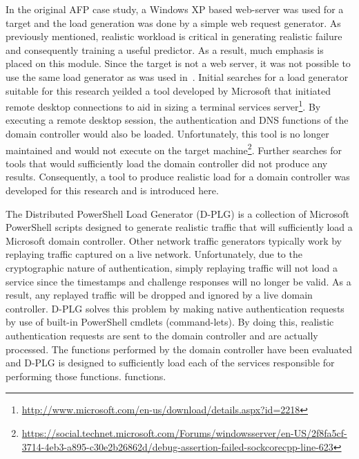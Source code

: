 In the original AFP case study, a Windows XP based web-server was used for a
target and the load generation was done by a simple web request
generator.  As previously mentioned, realistic workload is critical in
generating realistic failure and consequently training a useful predictor.  As
a result, much emphasis is placed on this module.  Since the target is not a
web server, it was not possible to use the same load generator as was used
in~\cite{irrera2015}.  Initial searches for a load generator suitable for this
research yeilded a tool developed by Microsoft that initiated remote desktop
connections to aid in sizing a terminal services
server\footnote{\url{http://www.microsoft.com/en-us/download/details.aspx?id=2218}}.
By executing a remote desktop session, the authentication and DNS functions of
the domain controller would also be loaded.  Unfortunately, this tool is no
longer maintained and would not execute on the target
machine\footnote{\url{https://social.technet.microsoft.com/Forums/windowsserver/en-US/2f8fa5cf-3714-4eb3-a895-c30e2b26862d/debug-assertion-failed-sockcorecpp-line-623}}.
Further searches for tools that would sufficiently load the domain controller
did not produce any results.  Consequently, a tool to produce realistic load
for a domain controller was developed for this research and is introduced here.


The Distributed PowerShell Load Generator (D-PLG) is a collection of Microsoft
PowerShell scripts designed to generate realistic traffic that will
sufficiently load a Microsoft domain controller.  Other network traffic
generators typically work by replaying traffic captured on a live network.
Unfortunately, due to the cryptographic nature of authentication, simply
replaying traffic will not load a service since the timestamps and challenge
responses will no longer be valid.  As a result, any replayed traffic will be
dropped and ignored by a live domain controller.  D-PLG solves this problem by
making native authentication requests by use of built-in PowerShell cmdlets
(command-lets).  By doing this, realistic authentication requests are sent to
the domain controller and are actually processed.  The functions performed by
the domain controller have been evaluated and D-PLG is designed to sufficiently
load each of the services responsible for performing those functions.
functions.

